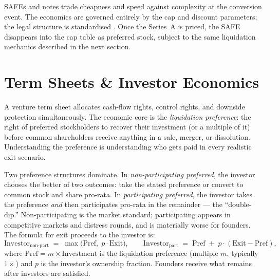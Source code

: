 SAFEs and notes trade cheapness and speed against complexity at the conversion event. The
economics are governed entirely by the cap and discount parameters; the legal structure is
standardised \parencite{feld2019venture}. Once the Series~A is priced, the SAFE disappears
into the cap table as preferred stock, subject to the same liquidation mechanics described in
the next section.

\section{Term Sheets \& Investor Economics}\label{sec:term-sheets}

A venture term sheet allocates cash-flow rights, control rights, and downside protection
simultaneously. The economic core is the \emph{liquidation preference}: the right of
preferred stockholders to recover their investment (or a multiple of it) before common
shareholders receive anything in a sale, merger, or dissolution. Understanding the preference
is understanding who gets paid in every realistic exit scenario.

Two preference structures dominate. In \emph{non-participating preferred}, the investor
chooses the better of two outcomes: take the stated preference or convert to common stock and
share pro-rata. In \emph{participating preferred}, the investor takes the preference
\emph{and} then participates pro-rata in the remainder --- the ``double-dip.'' Non-participating
is the market standard; participating appears in competitive markets and distress rounds, and
is materially worse for founders. The formula for exit proceeds to the investor is:
\begin{equation}\label{eq:liquidation-preference}
  \mathrm{Investor}_{\text{non-part}}
  \;=\; \max\!\bigl(\mathrm{Pref},\; p \cdot \mathrm{Exit}\bigr),
  \qquad
  \mathrm{Investor}_{\text{part}}
  \;=\; \mathrm{Pref} \;+\; p \cdot (\mathrm{Exit} - \mathrm{Pref}),
\end{equation}
where \(\mathrm{Pref} = m \times \mathrm{Investment}\) is the liquidation preference
(multiple \(m\), typically \(1\times\)) and \(p\) is the investor's ownership fraction.
Founders receive what remains after investors are satisfied.


